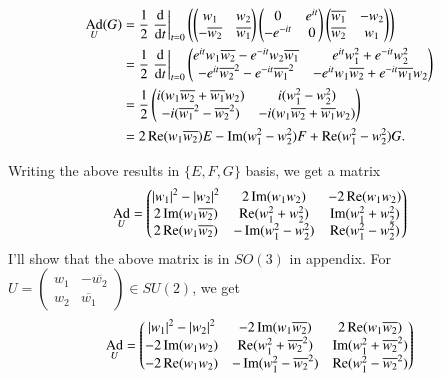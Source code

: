 \documentclass[a4paper, 12pt]{article}
\theoremstyle{Mydefinition}
\theoremstyle{Mytheorem}
\DeclareMathOperator{\Ad}{Ad}
\begin{document}
\begin{equation*}
\begin{split}
    \Ad_U(G) &= \frac{1}{2}\left.\dv{t}\right|_{t=0}\left(\begin{pmatrix}
        w_1 & w_2 \\
        -\overline{w_2} & \overline{w_1}
    \end{pmatrix}
    \begin{pmatrix}
        0 & e^{it}\\
        -e^{-it} & 0
    \end{pmatrix}
    \begin{pmatrix}
        \overline{w_1} & -w_2 \\
        \overline{w_2} & w_1
    \end{pmatrix}\right) \\
    &=\frac{1}{2}\left.\dv{t}\right|_{t=0}\begin{pmatrix}
        e^{it}w_1\overline{w_2}-e^{-it}w_2\overline{w_1} & e^{it}w_1^2 + e^{-it}w_2^2\\
        -e^{it}\overline{w_2}^2 - e^{-it}\overline{w_1}^2 & -e^{it}w_1\overline{w_2} + e^{-it}\overline{w_1}w_2
    \end{pmatrix}\\
    &=\frac{1}{2}\begin{pmatrix}
        i(w_1\overline{w_2} + \overline{w_1}w_2) & i(w_1^2-w_2^2) \\
        -i(\overline{w_1}^2-\overline{w_2}^2) & -i(w_1\overline{w_2} + \overline{w_1}w_2)
    \end{pmatrix}\\
    &=2\Re(w_1\overline{w_2})E - \Im(w_1^2-w_2^2)F + \Re(w_1^2-w_2^2)G.
\end{split}
\end{equation*}

Writing the above results in $\{E,F,G\}$ basis, we get a matrix
\begin{equation}\label{HW9:Eq2}
\Ad_U = \begin{pmatrix}
    \abs{w_1}^2-\abs{w_2}^2 & 2\Im(w_1w_2) & - 2\Re(w_1w_2)\\
    2\Im(w_1\overline{w_2}) & \Re(w_1^2+w_2^2) & \Im(w_1^2+w_2^2)\\
    2\Re(w_1\overline{w_2}) & - \Im(w_1^2-w_2^2) & \Re(w_1^2-w_2^2)
\end{pmatrix}
\end{equation}
I'll show that the above matrix is in $\mathit{SO}(3)$ in appendix. For $U=\begin{pmatrix}
    w_1 & -\overline{w_2}\\
    w_2 & \overline{w_1}
\end{pmatrix}\in \mathit{SU}(2)$, we get
\begin{equation*}
\Ad_U = \begin{pmatrix}
    \abs{w_1}^2-\abs{w_2}^2 & -2\Im(w_1\overline{w_2}) &  2\Re(w_1\overline{w_2})\\
    -2\Im(w_1w_2) & \Re(w_1^2+\overline{w_2}^2) & \Im(w_1^2+\overline{w_2}^2)\\
    -2\Re(w_1w_2) & - \Im(w_1^2-\overline{w_2}^2) & \Re(w_1^2-\overline{w_2}^2)
\end{pmatrix}
\end{equation*}
\end{document}
